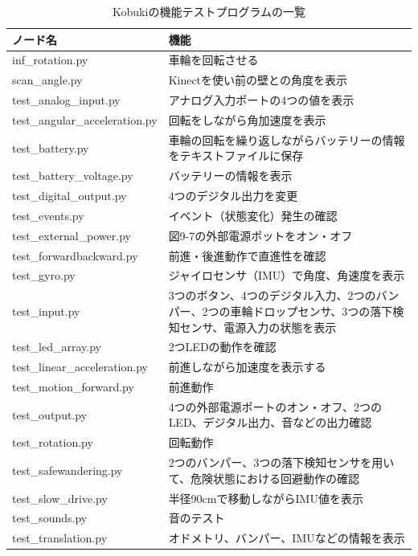 \begin{itemize}
\begin{table}[htp]
\centering
\begin{tabular}{p{5cm} p{8cm}}
\toprule
\textbf{ノード名} & \textbf{機能}\\
\midrule
inf\_rotation.py & 車輪を回転させる \\
scan\_angle.py & Kinectを使い前の壁との角度を表示 \\
test\_analog\_input.py  & アナログ入力ポートの4つの値を表示 \\
test\_angular\_acceleration.py  & 回転をしながら角加速度を表示 \\
test\_battery.py & 車輪の回転を繰り返しながらバッテリーの情報をテキストファイルに保存 \\
test\_battery\_voltage.py & バッテリーの情報を表示 \\
test\_digital\_output.py  & 4つのデジタル出力を変更 \\
test\_events.py  & イベント（状態変化）発生の確認 \\
test\_external\_power.py  & 図9-7の外部電源ポットをオン・オフ \\
test\_forwardbackward.py & 前進・後進動作で直進性を確認 \\
test\_gyro.py  & ジャイロセンサ（IMU）で角度、角速度を表示 \\
test\_input.py & 3つのボタン、4つのデジタル入力、2つのバンパー、2つの車輪ドロップセンサ、3つの落下検知センサ、電源入力の状態を表示 \\
test\_led\_array.py & 2つLEDの動作を確認 \\
test\_linear\_acceleration.py & 前進しながら加速度を表示する \\
test\_motion\_forward.py &  前進動作 \\
test\_output.py &  4つの外部電源ポートのオン・オフ、2つのLED、デジタル出力、音などの出力確認 \\
test\_rotation.py  & 回転動作 \\
test\_safewandering.py & 2つのバンパー、3つの落下検知センサを用いて、危険状態における回避動作の確認 \\
test\_slow\_drive.py  & 半径90cmで移動しながらIMU値を表示 \\
test\_sounds.py  & 音のテスト \\
test\_translation.py & オドメトリ、バンパー、IMUなどの情報を表示 \\
\bottomrule
\end{tabular}
\caption{Kobukiの機能テストプログラムの一覧}
\end{table}


\end{itemize}
